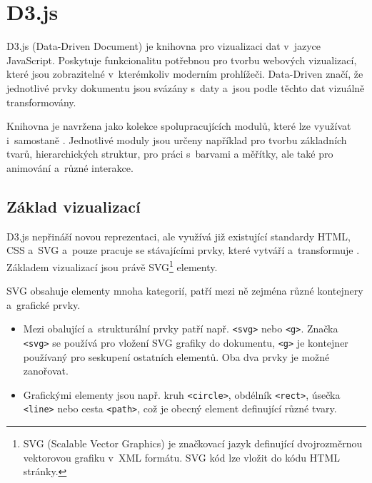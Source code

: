 \documentclass[
  digital, %
  oneside, %
  table,   %
  nolof,     %
  nolot,     %
]{fithesis3}
\begin{document}
\section{D3.js}
D3.js (Data-Driven Document) je knihovna pro vizualizaci dat v~jazyce JavaScript. Poskytuje funkcionalitu potřebnou pro tvorbu webových vizualizací, které jsou zobrazitelné v~kterémkoliv moderním prohlížeči. Data-Driven značí, že jednotlivé prvky dokumentu jsou svázány s~daty a~jsou podle těchto dat vizuálně transformovány. \par
Knihovna je navržena jako kolekce spolupracujících modulů, které lze využívat i~samostaně \cite{d3APIReference}. Jednotlivé moduly jsou určeny například pro tvorbu základních tvarů, hierarchických struktur, pro práci s~barvami a měřítky, ale také pro animování a~různé interakce.

\subsection{Základ vizualizací}
D3.js nepřináší novou reprezentaci, ale využívá již existující standardy HTML, CSS a~SVG a~pouze pracuje se stávajícími prvky, které vytváří a~transformuje \cite{d3jsorg}. Základem vizualizací jsou právě SVG\footnote{SVG (Scalable Vector Graphics) je značkovací jazyk definující dvojrozměrnou vektorovou grafiku v~XML formátu. SVG kód lze vložit do kódu HTML stránky.} elementy.\par
SVG obsahuje elementy mnoha kategorií, patří mezi ně zejména různé kontejnery a~grafické prvky. \cite{svgMozillaorg}
\begin{itemize}
  \item Mezi obalující a~strukturální prvky patří např. \verb|<svg>| nebo \verb|<g>|. Značka \verb|<svg>| se používá pro vložení SVG grafiky do dokumentu, \verb|<g>| je kontejner používaný pro seskupení ostatních elementů. Oba dva prvky je možné zanořovat.
  \item Grafickými elementy jsou např. kruh \verb|<circle>|, obdélník \verb|<rect>|, úsečka \verb|<line>| nebo cesta \verb|<path>|, což je obecný element definující různé tvary.
\end{itemize}
\end{document}
